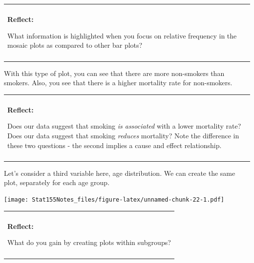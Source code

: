 \documentclass[]{book}
\newenvironment{Shaded}{\begin{snugshade}}{\end{snugshade}}
\newcommand{\DataTypeTok}[1]{\textcolor[rgb]{0.13,0.29,0.53}{#1}}
\newcommand{\KeywordTok}[1]{\textcolor[rgb]{0.13,0.29,0.53}{\textbf{#1}}}
\newcommand{\NormalTok}[1]{#1}
\newcommand{\OperatorTok}[1]{\textcolor[rgb]{0.81,0.36,0.00}{\textbf{#1}}}
\newcommand{\StringTok}[1]{\textcolor[rgb]{0.31,0.60,0.02}{#1}}
\newenvironment{reflect}
{
    \begin{center}
    
    \begin{tabular}{|p{0.8\textwidth}|}
    \rowcolor{LightBlue}
    \hline\\
    \rowcolor{LightBlue}
    \textbf{Reflect:}
}
{
    \\\rowcolor{LightBlue}
    \\\hline
    \end{tabular} 
    \end{center}
}
\begin{document}
\begin{reflect}
What information is highlighted when you focus on relative frequency in
the mosaic plots as compared to other bar plots?
\end{reflect}

With this type of plot, you can see that there are more non-smokers than smokers. Also, you see that there is a higher mortality rate for non-smokers.

\begin{reflect}
Does our data suggest that smoking \emph{is associated} with a lower
mortality rate? Does our data suggest that smoking \emph{reduces}
mortality? Note the difference in these two questions - the second
implies a cause and effect relationship.
\end{reflect}

Let's consider a third variable here, age distribution. We can create the same plot, separately for each age group.

\begin{Shaded}
\end{Shaded}

\texttt{[image: Stat155Notes\_files/figure-latex/unnamed-chunk-22-1.pdf]}

\begin{reflect}
What do you gain by creating plots within subgroups?
\end{reflect}
\end{document}
